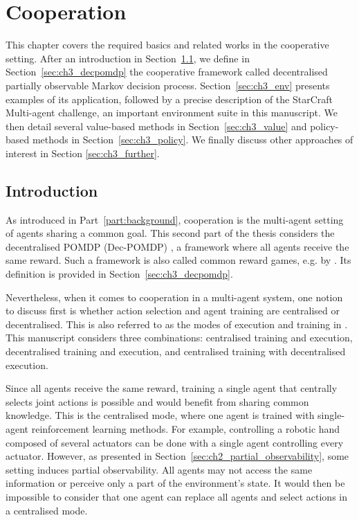 \chapter{Cooperation}\label{ch:cooperation}
\begin{chapter_outline}

This chapter covers the required basics and related works in the cooperative setting.
After an introduction in Section~\ref{sec:ch3_intro}, we define in Section~\ref{sec:ch3_decpomdp} the cooperative framework called decentralised partially observable Markov decision process.
Section~\ref{sec:ch3_env} presents examples of its application, followed by a precise description of the StarCraft Multi-agent challenge, an important environment suite in this manuscript.
We then detail several value-based methods in Section~\ref{sec:ch3_value} and policy-based methods in Section~\ref{sec:ch3_policy}.
We finally discuss other approaches of interest in Section \ref{sec:ch3_further}.
\end{chapter_outline}

\section{Introduction}
\label{sec:ch3_intro}
As introduced in Part~\ref{part:background}, cooperation is the multi-agent setting of agents sharing a common goal.
This second part of the thesis considers the decentralised POMDP (Dec-POMDP) \citep{DecPomdp}, a framework where all agents receive the same reward.
Such a framework is also called common reward games, e.g. by \cite{marl-book}.
Its definition is provided in Section~\ref{sec:ch3_decpomdp}.

Nevertheless, when it comes to cooperation in a multi-agent system, one notion to discuss first is whether action selection and agent training are centralised or decentralised.
This is also referred to as the modes of execution and training in \citep{marl-book}.
This manuscript considers three combinations: centralised training and execution, decentralised training and execution, and centralised training with decentralised execution.

Since all agents receive the same reward, training a single agent that centrally selects joint actions is possible and would benefit from sharing common knowledge.
This is the centralised mode, where one agent is trained with single-agent reinforcement learning methods.
For example, controlling a robotic hand composed of several actuators can be done with a single agent controlling every actuator.
However, as presented in Section~\ref{sec:ch2_partial_observability}, some setting induces partial observability.
All agents may not access the same information or perceive only a part of the environment's state.
It would then be impossible to consider that one agent can replace all agents and select actions in a centralised mode.

